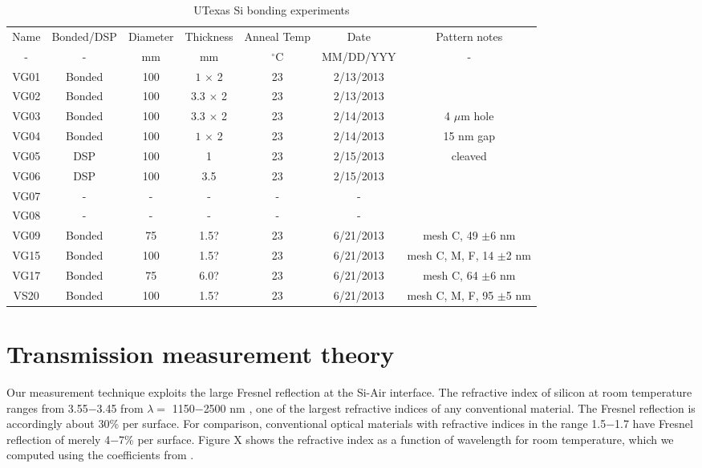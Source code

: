 \documentclass[osajnl,preprint,showpacs,superscriptaddress,12pt]{revtex4-1} %
\begin{document}
\begin{table}[h!]
\caption{UTexas Si bonding experiments \label{tabbondexper}}
\begin{center}
    \begin{tabular}{ c c c c c c c}
    \hline
    Name & Bonded/DSP & Diameter & Thickness & Anneal Temp & Date & Pattern notes \\ 
    - & - & mm & mm & $^\circ$C & MM/DD/YYY & - \\ 
        \hline
    VG01 & Bonded  & 100  &$1$ $\times$ 2 & 23  & 2/13/2013 &  \\
    VG02 & Bonded & 100 & $3.3$ $\times$ 2 &  23  & 2/13/2013 &  \\
    VG03 & Bonded & 100 & $3.3$ $\times$ 2 &  23 & 2/14/2013 & 4 $\mu$m hole \\    
    VG04 & Bonded & 100 & $1$ $\times$ 2 &  23 & 2/14/2013 & 15 nm gap \\        
    VG05 & DSP & 100 & 1&  23 & 2/15/2013 & cleaved  \\
    VG06 & DSP & 100 & 3.5 &  23 & 2/15/2013 & \\
    VG07 & - & - & - &  - & - & \\
    VG08 & - & - & - &  - & - & \\
    VG09 & Bonded & 75 & 1.5? & 23 & 6/21/2013 & mesh C, 49 $\pm$6 nm \\
    VG15 & Bonded & 100 & 1.5? &  23 & 6/21/2013 & mesh C, M, F, 14 $\pm$2 nm\\
    VG17 & Bonded & 75 & 6.0? &  23 & 6/21/2013 & mesh C, 64 $\pm$6 nm\\
    VS20 & Bonded & 100 & 1.5? &  23 & 6/21/2013 & mesh C, M, F, 95 $\pm$5 nm\\
    \hline
    \end{tabular}
\end{center}
\end{table}

\section{Transmission measurement theory}
\label{secTheory}


Our measurement technique exploits the large Fresnel reflection \cite{2001opt4.book.....H} at the Si-Air interface.  The refractive index of silicon at room temperature ranges from 3.55$-$3.45 from $\lambda = $ 1150$-$2500 nm \cite{2006SPIE.6273E..77F}, one of the largest refractive indices of any conventional material.  The Fresnel reflection is accordingly about 30\% per surface.  For comparison, conventional optical materials with refractive indices in the range 1.5$-$1.7 have Fresnel reflection of merely 4$-$7\% per surface.  Figure X shows the refractive index as a function of wavelength for room temperature, which we computed using the coefficients from \cite{2006SPIE.6273E..77F}.  
\end{document}
